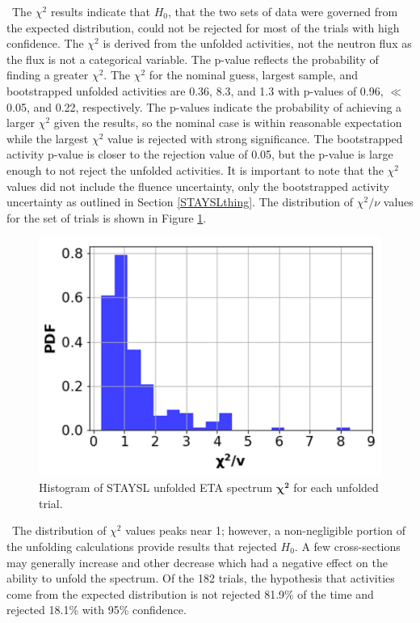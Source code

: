 \ The $\chi^{2}$ results indicate that $H_{0}$, that the two sets of data were governed from the expected distribution, could not be rejected for most of the trials with high confidence. 
The $\chi^2$ is derived from the unfolded activities, not the neutron flux as the flux is not a categorical variable. 
The p-value reflects the probability of finding a greater $\chi^{2}$. 
The $\chi^2$ for the nominal guess, largest sample, and bootstrapped unfolded activities are 0.36, 8.3, and 1.3 with p-values of 0.96, $\ll$ 0.05, and 0.22, respectively. 
The p-values indicate the probability of achieving a larger $\chi^2$ given the results, so the nominal case is within reasonable expectation while the largest $\chi^2$ value is rejected with strong significance. 
The bootstrapped activity p-value is closer to the rejection value of 0.05, but the p-value is large enough to not reject the unfolded activities.  
It is important to note that the $\chi^2$ values did not include the fluence uncertainty, only the bootstrapped activity uncertainty as outlined in Section \ref{STAYSLthing}.
The distribution of $\chi^2/\nu$ values for the set of trials is shown in Figure \ref{fig:chi2sfromunfold}. 

\begin{figure}[!htbp]
	\centering
	\includegraphics[width=13cm]{Figures/Chapter4/Unfold/Chi2_Histogram.png}
	\caption{Histogram of STAYSL unfolded ETA spectrum $\mathbf{\chi^2}$ for each unfolded trial.}
	\label{fig:chi2sfromunfold}
\end{figure}

\ The distribution of $\chi^2$ values peaks near 1; however, a non-negligible portion of the unfolding calculations provide results that rejected $H_{0}$. 
A few cross-sections may generally increase and other decrease which had a negative effect on the ability to unfold the spectrum. 
Of the 182 trials, the hypothesis that activities come from the expected distribution is not rejected 81.9\% of the time and rejected 18.1\% with 95\% confidence.

